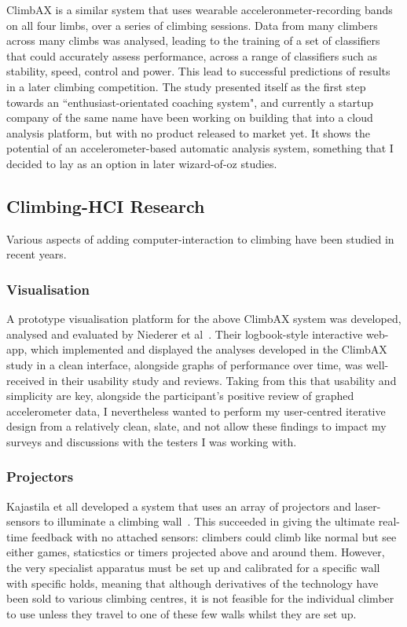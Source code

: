 ClimbAX \cite{climbaxstudy} is a similar system that uses wearable acceleronmeter-recording bands on all four limbs, over a series of climbing sessions.
Data from many climbers across many climbs was analysed, leading to the training of a set of classifiers that could accurately assess performance, across a range of classifiers such as stability, speed, control and power.
This lead  to successful predictions of results in a later climbing competition.
The study presented itself as the first step towards an ``enthusiast-orientated coaching system", and currently a startup company of the same name have been working on building that into a cloud analysis platform, but with no product released to market yet.
It shows the potential of an accelerometer-based automatic analysis system, something that I decided to lay as an option in later wizard-of-oz studies.


\subsection{Climbing-HCI Research}
Various aspects of adding computer-interaction to climbing have been studied in recent years.

\subsubsection{Visualisation}
A prototype visualisation platform for the above ClimbAX system was developed, analysed and evaluated by Niederer et al~\cite{niederervis}.
Their logbook-style interactive web-app, which implemented and displayed the analyses developed in the ClimbAX study in a clean interface, alongside graphs of performance over time, was well-received in their usability study and reviews.
Taking from this that usability and simplicity are key, alongside the participant's positive review of graphed accelerometer data, I nevertheless wanted to perform my user-centred iterative design from a relatively clean, slate, and not allow these findings to impact my surveys and discussions with the testers I was working with.

\subsubsection{Projectors}
Kajastila et all developed a system that uses an array of projectors and laser-sensors to illuminate a climbing wall~\cite{projectedclimbwall}.
This succeeded in giving the ultimate real-time feedback with no attached sensors: climbers could climb like normal but see either games, staticstics or timers projected above and around them.
However, the very specialist apparatus must be set up and calibrated for a specific wall with specific holds, meaning that although derivatives of the technology have been sold to various climbing centres, it is not feasible for the individual climber to use unless they travel to one of these few walls whilst they are set up.

